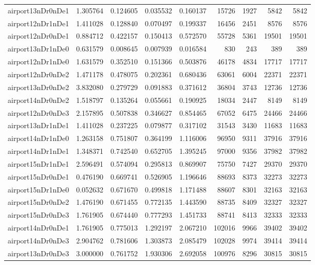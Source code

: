 \documentclass[../../../thesis.tex]{subfiles}
\begin{document}
\begin{longtable}{|l|r|r|r|r|r|r|r|r|}
airport13nDr0nDe1 & 1.305764 & 0.124605 & 0.035532 & 0.160137 & 15726 & 1927 & 5842 & 5842 \\
airport12nDr1nDe1 & 1.411028 & 0.128840 & 0.070497 & 0.199337 & 16456 & 2451 & 8576 & 8576 \\
airport12nDr0nDe1 & 0.884712 & 0.422157 & 0.150413 & 0.572570 & 55728 & 5361 & 19501 & 19501 \\
airport13nDr1nDe0 & 0.631579 & 0.008645 & 0.007939 & 0.016584 & 830 & 243 & 389 & 389 \\
airport12nDr1nDe0 & 1.631579 & 0.352510 & 0.151366 & 0.503876 & 46178 & 4834 & 17717 & 17717 \\
airport12nDr0nDe2 & 1.471178 & 0.478075 & 0.202361 & 0.680436 & 63061 & 6004 & 22371 & 22371 \\
airport13nDr0nDe2 & 3.832080 & 0.279729 & 0.091883 & 0.371612 & 36804 & 3743 & 12736 & 12736 \\
airport14nDr0nDe2 & 1.518797 & 0.135264 & 0.055661 & 0.190925 & 18034 & 2447 & 8149 & 8149 \\
airport12nDr0nDe3 & 2.157895 & 0.507838 & 0.346627 & 0.854465 & 67052 & 6475 & 24466 & 24466 \\
airport13nDr1nDe1 & 1.411028 & 0.237225 & 0.079877 & 0.317102 & 31543 & 3430 & 11683 & 11683 \\
airport14nDr1nDe0 & 1.263158 & 0.751807 & 0.364199 & 1.116006 & 96950 & 9311 & 37916 & 37916 \\
airport14nDr1nDe1 & 1.348371 & 0.742540 & 0.652705 & 1.395245 & 97000 & 9356 & 37982 & 37982 \\
airport15nDr1nDe1 & 2.596491 & 0.574094 & 0.295813 & 0.869907 & 75750 & 7427 & 29370 & 29370 \\
airport15nDr0nDe1 & 0.476190 & 0.669741 & 0.526905 & 1.196646 & 88693 & 8373 & 32273 & 32273 \\
airport15nDr1nDe0 & 0.052632 & 0.671670 & 0.499818 & 1.171488 & 88607 & 8301 & 32163 & 32163 \\
airport15nDr0nDe2 & 1.476190 & 0.671455 & 0.772135 & 1.443590 & 88735 & 8409 & 32327 & 32327 \\
airport15nDr0nDe3 & 1.761905 & 0.674440 & 0.777293 & 1.451733 & 88741 & 8413 & 32333 & 32333 \\
airport14nDr0nDe1 & 1.761905 & 0.775013 & 1.292197 & 2.067210 & 102016 & 9966 & 39402 & 39402 \\
airport14nDr0nDe3 & 2.904762 & 0.781606 & 1.303873 & 2.085479 & 102028 & 9974 & 39414 & 39414 \\
airport13nDr0nDe3 & 3.000000 & 0.761752 & 1.930306 & 2.692058 & 100976 & 8296 & 30815 & 30815 \\

\end{longtable}
\end{document}
